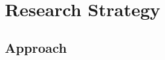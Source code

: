 \documentclass{grantplate}
\begin{document}


\cleardoublepage

\section{Research Strategy}



\subsection{Approach}






\clearpage


\printbibliography[heading=bibintoc] %
\end{document}
